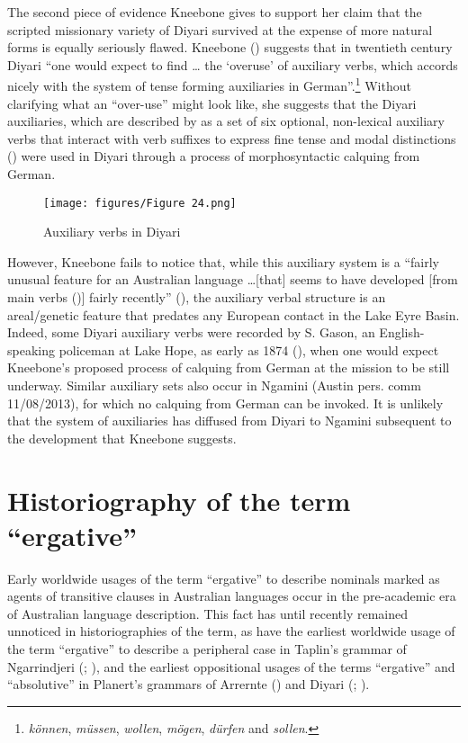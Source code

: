 The second piece of evidence Kneebone gives to support her claim that the scripted missionary variety of Diyari survived at the expense of more natural forms is equally seriously flawed. Kneebone (\citeyear[72]{kneebone_language_2005}) suggests that in twentieth century Diyari “one would expect to find … the `overuse' of auxiliary verbs, which accords nicely with the system of tense forming auxiliaries in German”.\footnote{\textit{können}, \textit{müssen}, \textit{wollen}, \textit{mögen}, \textit{dürfen} and \textit{sollen}.}  Without clarifying what an “over-use” might look like, she suggests that the Diyari auxiliaries, which are described by \citet[13, 91--94]{austin_grammar_2013} as a set of six optional, non-lexical auxiliary verbs that interact with verb suffixes to express fine tense and modal distinctions () were used in Diyari through a process of morphosyntactic calquing from German.

\begin{figure}
\texttt{[image: figures/Figure 24.png]}
\caption{Auxiliary verbs in Diyari \citep[92]{austin_grammar_2013}}
\label{fig:2:24}
\end{figure} 

However, Kneebone fails to notice that, while this auxiliary system is a “fairly unusual feature for an Australian language …[that] seems to have developed [from main verbs (\citealt[13]{austin_grammar_2013})] fairly recently” (\citealt[70]{austin_grammar_2013}), the auxiliary verbal structure is an areal/genetic feature that predates any European contact in the Lake Eyre Basin. Indeed, some Diyari auxiliary verbs were recorded by S. Gason, an English-speaking policeman at Lake Hope, as early as 1874 (\citealt[39]{austin_grammar_2013}), when one would expect Kneebone’s proposed process of calquing from German at the mission to be still underway. Similar auxiliary sets also occur in Ngamini (Austin pers. comm 11/08/2013), for which no calquing from German can be invoked. It is unlikely that the system of auxiliaries has diffused from Diyari to Ngamini subsequent to the development that Kneebone suggests.

\section{Historiography of the term ``ergative''}
\label{sec:key:2.6}
\label{sec:2.6}

Early worldwide usages of the term “ergative” to describe nominals marked as agents of transitive clauses in Australian languages occur in the pre-academic era of Australian language description. This fact has until recently remained unnoticed in historiographies of the term, as have the earliest worldwide usage of the term “ergative” to describe a peripheral case in Taplin’s grammar of Ngarrindjeri (\citeyear{taplin_notes_1870}; ), and the earliest oppositional usages of the terms “ergative” and “absolutive” in Planert’s grammars of Arrernte (\citeyear{planert_australische_1907}) and Diyari (\citeyear{planert_australische_1908}; ).

